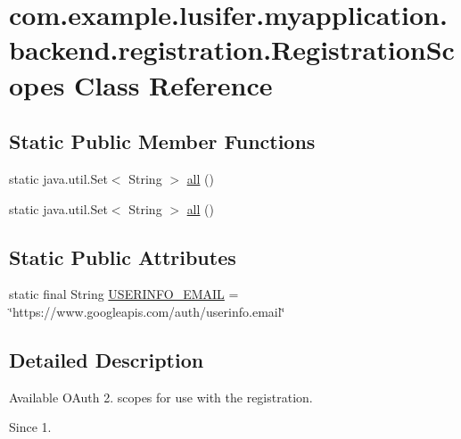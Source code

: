 \hypertarget{classcom_1_1example_1_1lusifer_1_1myapplication_1_1backend_1_1registration_1_1_registration_scopes}{}\section{com.\+example.\+lusifer.\+myapplication.\+backend.\+registration.\+Registration\+Scopes Class Reference}
\label{classcom_1_1example_1_1lusifer_1_1myapplication_1_1backend_1_1registration_1_1_registration_scopes}
\subsection*{Static Public Member Functions}
\begin{DoxyCompactItemize}
\item 
static java.\+util.\+Set$<$ String $>$ \hyperlink{classcom_1_1example_1_1lusifer_1_1myapplication_1_1backend_1_1registration_1_1_registration_scopes_a23d0c80a9577466200a8fa346956659b}{all} ()
\item 
static java.\+util.\+Set$<$ String $>$ \hyperlink{classcom_1_1example_1_1lusifer_1_1myapplication_1_1backend_1_1registration_1_1_registration_scopes_a23d0c80a9577466200a8fa346956659b}{all} ()
\end{DoxyCompactItemize}
\subsection*{Static Public Attributes}
\begin{DoxyCompactItemize}
\item 
static final String \hyperlink{classcom_1_1example_1_1lusifer_1_1myapplication_1_1backend_1_1registration_1_1_registration_scopes_acbdfff3045dac9ee891d263de11fd7ab}{U\+S\+E\+R\+I\+N\+F\+O\+\_\+\+E\+M\+A\+I\+L} = \char`\"{}https\+://www.\+googleapis.\+com/auth/userinfo.\+email\char`\"{}
\end{DoxyCompactItemize}


\subsection{Detailed Description}
Available O\+Auth 2. scopes for use with the registration.

\begin{DoxySince}{Since}
1. 
\end{DoxySince}


